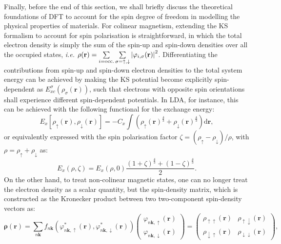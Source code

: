 Finally, before the end of this section, we shall briefly discuss the theoretical foundations of DFT to account for the spin degree of freedom in modelling the physical properties of materials. For colinear magnetism,\cite{von1972local,gunnarsson1976exchange} extending the KS formalism to account for spin polarisation is straightforward, in which the total electron density is simply the sum of the spin-up and spin-down densities over all the occupied states, \emph{i.e.} $\rho(\mathbf{r})=\sum\limits_{i=\mbox{\scriptsize{occ.}}}\sum\limits_{\sigma=\uparrow,\downarrow}\left\vert \varphi_{i,\sigma}(\mathbf{r}) \right\vert^2$. Differentiating the contributions from spin-up and spin-down electron densities to the total system energy can be achieved by making the KS potential become explicitly spin-dependent as $E_{xc}^{\sigma}(\rho_\sigma (\bm{r}))$, such that electrons with opposite spin orientations shall experience different spin-dependent potentials. In LDA, for instance, this can be achieved with the following functional for the exchange energy:
\begin{equation*}
    E_{x}[\rho_{\uparrow}(\bm{r}),\rho_{\downarrow}(\bm{r})]=-C_{x}\int\left(\rho_{\uparrow}(\bm{r})^{\frac{4}{3}}+\rho_{\downarrow}(\bm{r})^{\frac{4}{3}}\right) \mbox{d}\bm{r},
\end{equation*}
or equivalently expressed with the spin polarisation factor $\zeta=(\rho_{\uparrow}-\rho_{\downarrow})/\rho$, with $\rho=\rho_{\uparrow}+\rho_{\downarrow}$ as:
\begin{equation*}
    E_{x}(\rho,\zeta)=E_{x}(\rho,0)\frac{(1+\zeta)^{\frac{4}{3}}+(1-\zeta)^{\frac{4}{3}}}{2}.
\end{equation*}
On the other hand, to treat non-colinear magnetic states,\cite{kubler1988density,kurz2004ab,peralta2007noncollinear} one can no longer treat the electron density as a scalar quantity, but the spin-density matrix, which is constructed as the Kronecker product between two two-component spin-density vectors as: 
\begin{equation}
    \label{eq:density_matrix}
    \bm{\rho}(\bm{r})=\sum_{n\bm{k}}f_{n\bm{k}}\left(\varphi^{*}_{n\bm{k},\uparrow}(\bm{r}),\varphi^{*}_{n\bm{k},\downarrow}(\bm{r})\right)\left(\begin{array}{c}
        \varphi_{n\bm{k},\uparrow}(\bm{r})  \\
         \varphi_{n\bm{k},\downarrow}(\bm{r})
    \end{array}\right)=\left(\begin{array}{cc}
      \rho_{\uparrow\uparrow}(\bm{r})   &  \rho_{\uparrow\downarrow}(\bm{r})\\
      \rho_{\downarrow\uparrow}(\bm{r})   & \rho_{\downarrow\downarrow}(\bm{r})
    \end{array} \right),
\end{equation}
